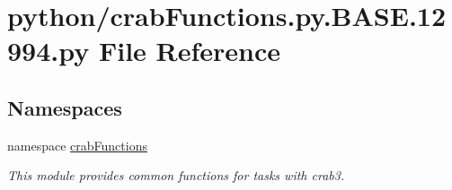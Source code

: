 \section{python/crabFunctions.py.BASE.12994.py File Reference}
\label{crabFunctions_8py_8BASE_812994_8py}
\subsection*{Namespaces}
\begin{DoxyCompactItemize}
\item 
namespace \hyperlink{namespacecrabFunctions}{crabFunctions}


\begin{DoxyCompactList}\small\item\em This module provides common functions for tasks with crab3. \item\end{DoxyCompactList}\end{DoxyCompactItemize}
